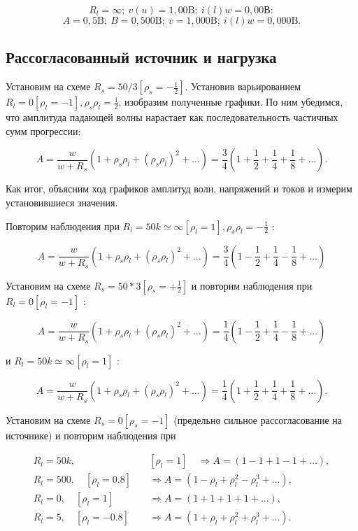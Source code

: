 \documentclass[a4paper, 14pt]{extarticle}%
\begin{document}
\[R_l =\infty;\  v(u)=1,00 \text{B};\ i(l)w =0,00 \text{В} :\]
\[  A = 0,5 \text{B};\ B = 0,500 \text{B};\ v = 1,000 \text{B};\ i(l)w = 0,000 \text{B}.\]


\subsection{Рассогласованный источник и нагрузка}

Установим на схеме $R_{s}=50 / 3\left[\rho_{s}=-\frac{1}{2}\right] .$ Установив варьированием $R_{l}=0\left[\rho_{l}=-1\right], \rho_{s} \rho_{l}=\frac{1}{2}$, изобразим полученные графики. По ним убедимся, что амплитуда падающей волны нарастает как последовательность частичных сумм прогрессии:


\[
A=\frac{w}{w+R_{s}}\left(1+\rho_{s} \rho_{l}+\left(\rho_{s} \rho_{l}\right)^{2}+\ldots\right)=\frac{3}{4}\left(1+\frac{1}{2}+\frac{1}{4}+\frac{1}{8}+\ldots\right) .
\]

Как итог, объясним ход графиков амплитуд волн, напряжений и токов и измерим установившиеся значения.

Повторим наблюдения при $R_{l}=50 k \simeq \infty\left[\rho_{l}=1\right], \rho_{s} \rho_{l}=-\frac{1}{2}$ : 

\[A=\frac{w}{w+R_{s}}\left(1+\rho_{s} \rho_{l}+\left(\rho_{s} \rho_{l}\right)^{2}+\ldots\right)=\frac{3}{4}\left(1-\frac{1}{2}+\frac{1}{4}-\frac{1}{8}+\ldots\right)\]

Установим на схеме $R_{s}=50 * 3\left[\rho_{s}=+\frac{1}{2}\right]$ и повторим наблюдения при $R_{l}=0\left[\rho_{l}=-1\right]$ :

\[A=\frac{w}{w+R_{s}}\left(1+\rho_{s} \rho_{l}+\left(\rho_{s} \rho_{l}\right)^{2}+\ldots\right)=\frac{1}{4}\left(1-\frac{1}{2}+\frac{1}{4}-\frac{1}{8}+\ldots\right)\]

и $R_{l}=50 k \simeq \infty\left[\rho_{l}=1\right]$ :

\[A=\frac{w}{w+R_{s}}\left(1+\rho_{s} \rho_{l}+\left(\rho_{s} \rho_{l}\right)^{2}+\ldots\right)=\frac{1}{4}\left(1+\frac{1}{2}+\frac{1}{4}+\frac{1}{8}+\ldots\right) .\]

Установим на схеме $R_{s}=0\left[\rho_{s}=-1\right]$ (предельно сильное рассогласование на источнике) и повторим наблюдения при

\[
\begin{aligned}
R_{l}=50 k, &\left[\rho_{l}=1\right] \quad \Rightarrow A=(1-1+1-1+\ldots), \\
R_{l}=500, \quad\left[\rho_{l}=0.8\right] \quad & \Rightarrow A=\left(1-\rho_{l}+\rho_{l}^{2}-\rho_{l}^{3}+\ldots\right), \\
R_{l}=0, \quad\left[\rho_{l}=1\right] \quad & \Rightarrow A=(1+1+1+1+\ldots), \\
R_{l}=5, \quad\left[\rho_{l}=-0.8\right] \quad & \Rightarrow A=\left(1+\rho_{l}+\rho_{l}^{2}+\rho_{l}^{3}+\ldots\right).
\end{aligned}
\]
\end{document}
